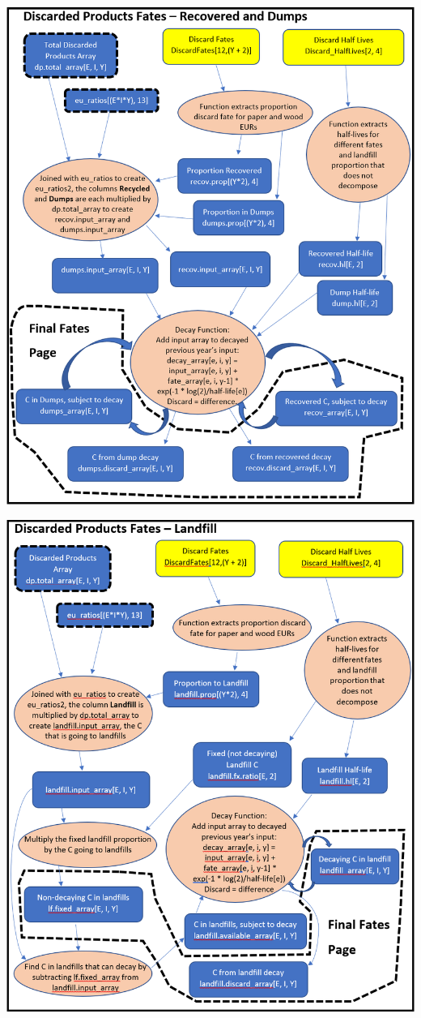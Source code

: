 \documentclass[
  openany]{book}
\begin{document}
\newpage

\includegraphics[width=1\linewidth]{images/schematic-5}

\newpage

\includegraphics[width=1\linewidth]{images/schematic-6}
\end{document}
